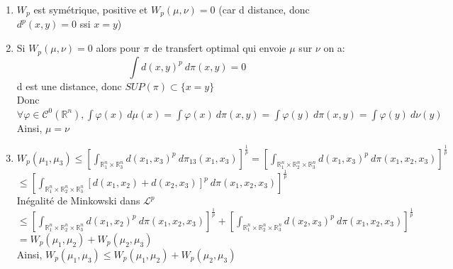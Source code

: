 \documentclass{report}
\begin{document}
\begin{myproof}
\begin{enumerate}
    \item 
        $W_p$ est symétrique, positive et $W_p (\mu , \nu) = 0$ (car d distance, donc $d^{p}(x,y) = 0$ ssi $x=y$)\\
    \item
        Si $W_p (\mu , \nu ) = 0$ alors pour $\pi$ de transfert optimal qui envoie $\mu$ sur $\nu$ on a:
        $$\int {d(x,y)^{p}} \: d{\pi(x,y)} = 0$$
        d est une distance, donc $SUP(\pi) \subset \{x=y \}$\\
        Donc $\forall \varphi \in \mathcal{C}^{0}(\mathbb{R}^{n}), \int {\varphi
        (x)} \: d{\mu (x)} = \int {\varphi (x)} \: d{\pi(x,y)} = \int {\varphi (y)} \:
        d{\pi(x,y)} =  \int {\varphi (y)} \: d{\nu (y)}$\\
        Ainsi, $\mu = \nu$
    \item
        $W_p (\mu_1 , \mu_3) 
        \le [\int_{\mathbb{R}^{n}_1 \times \mathbb{R}^{n}_3} {d(x_1,x_3)^{p}} \: d{\pi_{13} (x_1 , x_3)}]^{\frac{1}{p}}
        = [\int_{\mathbb{R}^{n}_1 \times \mathbb{R}^{n}_{2} \times \mathbb{R}^{n}_{3}} {d(x_1,x_3)^{p}} \: d{\pi(x_1 , x_2 , x_3)}]^{\frac{1}{p}}$\\ 
        $\le [\int_{\mathbb{R}^{n}_1 \times \mathbb{R}^{n}_{2} \times
        \mathbb{R}^{n}_{3}} {[d(x_1,x_2) + d(x_2, x_3)]^{p}} \: d{\pi(x_1 , x_2 ,
        x_3)}]^{\frac{1}{p}}$\\ 
        Inégalité de Minkowski dans $\mathcal{L}^{p}$\\
        $\le [\int_{\mathbb{R}^{n}_1 \times \mathbb{R}^{n}_{2} \times \mathbb{R}^{n}_{3}} {d(x_1,x_2)^{p}} \: d{\pi(x_1 , x_2 , x_3)}]^{\frac{1}{p}}
        + [\int_{\mathbb{R}^{n}_1 \times \mathbb{R}^{n}_{2} \times \mathbb{R}^{n}_{3}} {d(x_2,x_3)^{p}} \: d{\pi(x_1 , x_2 , x_3)}]^{\frac{1}{p}}$
        $= W_p (\mu_1 , \mu_2) + W_p (\mu_2 , \mu_3)$\\
        Ainsi, $W_p (\mu_1 , \mu_3) \le W_p (\mu_1 , \mu_2) + W_p (\mu_2 , \mu_3)$\\
\end{enumerate}

\end{myproof}

\end{document}
